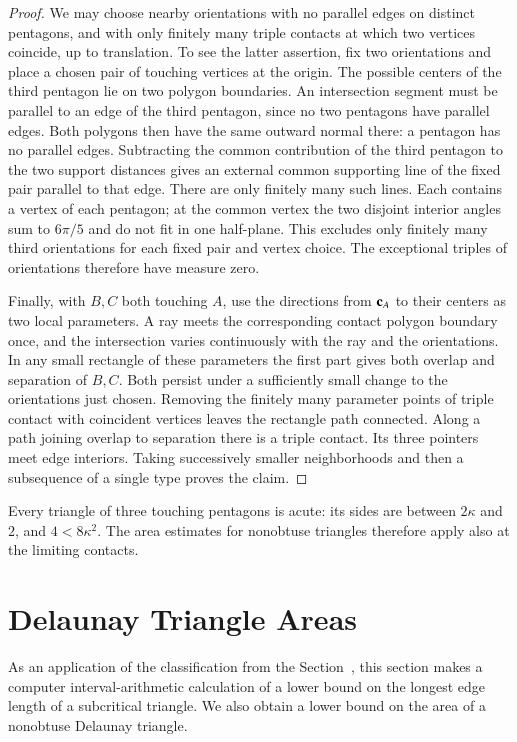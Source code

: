 \begin{proof}
We may choose nearby orientations with no parallel edges on distinct
pentagons, and with only finitely many triple contacts at which two
vertices coincide, up to translation. To see the latter assertion,
fix two orientations and place a chosen pair of touching vertices
at the origin. The possible centers of the third pentagon lie on two
polygon boundaries. An intersection segment must be parallel to an
edge of the third pentagon, since no two pentagons have parallel
edges. Both polygons then have the same outward normal there: a
pentagon has no parallel edges. Subtracting the common contribution
of the third pentagon to the two support distances gives an external
common supporting line of the fixed pair parallel to that edge.
There are only finitely many such lines. Each contains a vertex of
each pentagon; at the common vertex the two disjoint interior angles
sum to $6\pi/5$ and do not fit in one half-plane. This excludes only
finitely many third orientations for each fixed pair and vertex choice.
The exceptional triples of orientations therefore have measure zero.

Finally, with $B,C$ both touching $A$, use the directions from ${\mathbf c}_A$
to their centers as two local parameters. A ray meets the corresponding
contact polygon boundary once, and the intersection varies continuously
with the ray and the orientations. In any small rectangle of these
parameters the first part gives both overlap and separation of $B,C$.
Both persist under a sufficiently small change to the orientations
just chosen. Removing the finitely many parameter points of triple
contact with coincident vertices leaves the rectangle path connected.
Along a path joining overlap to separation there is a triple contact.
Its three pointers meet edge interiors. Taking successively smaller
neighborhoods and then a subsequence of a single type proves the claim.
\end{proof}

Every triangle of three touching pentagons is acute: its sides are
between $2\kappa$ and $2$, and $4<8\kappa^2$. The area estimates for
nonobtuse triangles therefore apply also at the limiting contacts.

\section{Delaunay Triangle Areas}

As an application of the classification from the
Section~, this section makes a computer interval-arithmetic
calculation of a lower bound on the longest edge length of a
subcritical triangle.  We also obtain a lower bound on the area of a
nonobtuse Delaunay triangle.

